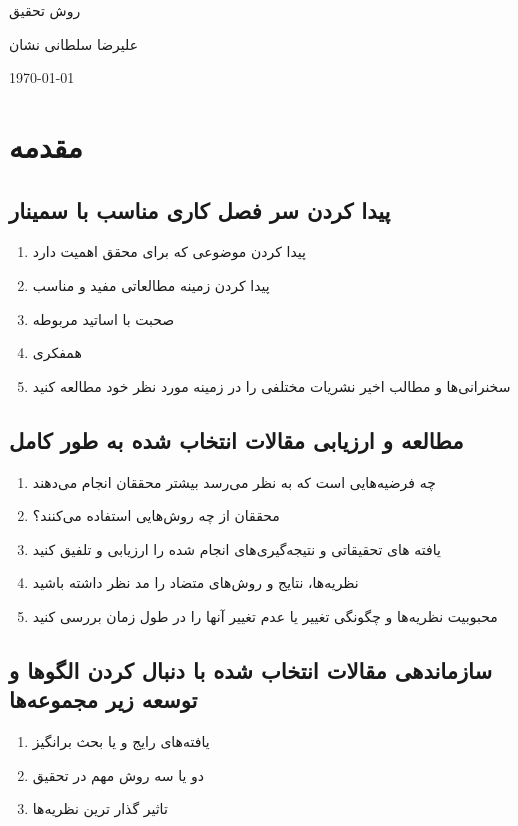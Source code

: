 \documentclass[20pt, a4paper]{article}
\begin{document}
\centerline{روش تحقیق}
\centerline{علیرضا سلطانی نشان}
\centerline{\today}
\tableofcontents

\newpage

\section{مقدمه}

\subsection{پیدا کردن سر فصل کاری مناسب با سمینار}

\begin{enumerate}
    \item پیدا کردن موضوعی که برای محقق اهمیت دارد
    \item پیدا کردن زمینه مطالعاتی مفید و مناسب
    \item صحبت با اساتید مربوطه
    \item همفکری
    \item سخنرانی‌ها و مطالب اخیر نشریات مختلفی را در زمینه مورد نظر خود مطالعه
    کنید
\end{enumerate}

\subsection{مطالعه و ارزیابی مقالات انتخاب شده به طور کامل}

\begin{enumerate}
    \item چه فرضیه‌هایی است که به نظر می‌رسد بیشتر محققان انجام می‌دهند
    \item محققان از چه روش‌هایی استفاده می‌کنند؟
    \item یافته ‌های تحقیقاتی و نتیجه‌گیری‌های انجام شده را ارزیابی و تلفیق کنید
    \item نظریه‌ها، نتایج و روش‌های متضاد را مد نظر داشته باشید
    \item محبوبیت نظریه‌ها و چگونگی تغییر یا عدم تغییر آنها را در طول زمان بررسی
    کنید
\end{enumerate}

\subsection{سازماندهی مقالات انتخاب شده با دنبال کردن الگو‌ها و توسعه زیر
مجموعه‌ها}

\begin{enumerate}
    \item یافته‌های رایج و یا بحث برانگیز
    \item دو یا سه روش مهم در تحقیق
    \item تاثیر گذار ترین نظریه‌ها
\end{enumerate}
\end{document}
